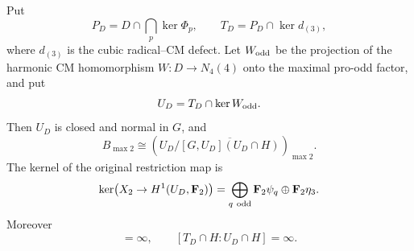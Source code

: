 \begin{theorem}
\label{thm:odd-harmonic-cm-gate}
Put
\[
 P_D=D\cap\bigcap_p\ker\Phi_p,\qquad
 T_D=P_D\cap\ker d_{(3)},
\]
where \(d_{(3)}\) is the cubic radical--CM defect.
Let \(W_{\rm odd}\) be the projection of the harmonic CM
homomorphism \(W:D\to N_4(4)\) onto the maximal pro-odd factor,
and put
\[
 U_D=T_D\cap\ker W_{\rm odd}.
\]
Then \(U_D\) is closed and normal in \(G\), and
\begin{equation}
 B_{\max2}\cong
 \left(U_D/\overline{[G,U_D](U_D\cap H)}\right)_{\max2}.  \label{eq:odd-cm-1}
\end{equation}
The kernel of the original restriction map is
\begin{equation}
 \ker\bigl(X_2\to H^1(U_D,\mathbf F_2)\bigr)
  =\bigoplus_{q\ {\rm odd}}\mathbf F_2\psi_q
                           \oplus\mathbf F_2\eta_3.     \label{eq:odd-cm-2}
\end{equation}
Moreover
\begin{equation}
 [T_D:U_D]=\infty,\qquad
 [T_D\cap H:U_D\cap H]=\infty.                          \label{eq:odd-cm-3}
\end{equation}
\end{theorem}


